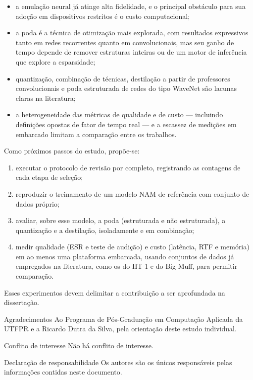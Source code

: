 \documentclass[%
  a4paper,%
  12pt,%
  fleqn,%
  english,%
  brazilian,%
]{article}
\begin{document}
\begin{itemize}
\item a emulação neural já atinge alta fidelidade, e o principal obstáculo para sua adoção em dispositivos restritos é o custo computacional;
\item a poda é a técnica de otimização mais explorada, com resultados expressivos tanto em redes recorrentes quanto em convolucionais, mas seu ganho de tempo depende de remover estruturas inteiras ou de um motor de inferência que explore a esparsidade;
\item quantização, combinação de técnicas, destilação a partir de professores convolucionais e poda estruturada de redes do tipo WaveNet são lacunas claras na literatura;
\item a heterogeneidade das métricas de qualidade e de custo --- incluindo definições opostas de fator de tempo real --- e a escassez de medições em  embarcado limitam a comparação entre os trabalhos.
\end{itemize}

Como próximos passos do estudo, propõe-se:
\begin{enumerate}[label = {\alph*)}]
\item executar o protocolo de revisão por completo, registrando as contagens de cada etapa de seleção;
\item reproduzir o treinamento de um modelo NAM de referência com conjunto de dados próprio;
\item avaliar, sobre esse modelo, a poda (estruturada e não estruturada), a quantização e a destilação, isoladamente e em combinação;
\item medir qualidade (ESR e teste de audição) e custo (latência, RTF e memória) em ao menos uma plataforma embarcada, usando conjuntos de dados já empregados na literatura, como os do HT-1 e do Big Muff, para permitir comparação.
\end{enumerate}
Esses experimentos devem delimitar a contribuição a ser aprofundada na dissertação.

\begin{InfoSection}{Agradecimentos}
Ao Programa de Pós-Graduação em Computação Aplicada da UTFPR e a Ricardo Dutra da Silva, pela orientação deste estudo individual.
\end{InfoSection}

\begin{InfoSection}{Conflito de interesse}
Não há conflito de interesse.
\end{InfoSection}

\begin{InfoSection}{Declaração de responsabilidade}
Os autores são os únicos responsáveis pelas informações contidas neste documento.
\end{InfoSection}

\printbibliography%
\end{document}
